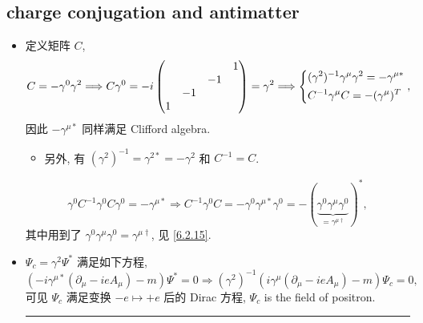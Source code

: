 \subsection{charge conjugation and antimatter}
\begin{itemize}
	\item 定义矩阵 $C$,
	\begin{equation}
		C = - \gamma^0 \gamma^2 \Longrightarrow C \gamma^0 = - i \begin{pmatrix}
			& & & 1 \\
			& & - 1 & \\
			& - 1 & & \\
			1 & & &
		\end{pmatrix} = \gamma^2 \Longrightarrow \begin{dcases}
			(\gamma^2)^{- 1} \gamma^\mu \gamma^2 = - \gamma^{\mu *} \\
			C^{- 1} \gamma^\mu C = - (\gamma^\mu)^T
		\end{dcases},
	\end{equation}
	因此 $- \gamma^{\mu *}$ 同样满足 Clifford algebra.
	\begin{itemize}
		\item 另外, 有 $(\gamma^2)^{- 1} = \gamma^{2 *} = - \gamma^2$ 和 $C^{- 1} = C$.
	\end{itemize}
	
	\begin{tcolorbox}[title=calculation:]
		\begin{equation}
			\gamma^0 C^{- 1} \gamma^0 C \gamma^0 = - \gamma^{\mu *} \Longrightarrow C^{- 1} \gamma^0 C = - \gamma^0 \gamma^{\mu *} \gamma^0 = - (\underbrace{\gamma^0 \gamma^\mu \gamma^0}_{= \gamma^{\mu \dag}})^*,
		\end{equation}
		其中用到了 $\gamma^0 \gamma^\mu \gamma^0 = \gamma^{\mu \dag}$, 见 \eqref{6.2.15}.
	\end{tcolorbox}
	
	\item $\Psi_c = \gamma^2 \Psi^*$ 满足如下方程,
	\begin{equation}
		(- i \gamma^{\mu *} (\partial_\mu - i e A_\mu) - m) \Psi^* = 0 \Longrightarrow (\gamma^2)^{- 1} (i \gamma^\mu (\partial_\mu - i e A_\mu) - m) \Psi_c = 0,
	\end{equation}
	可见 $\Psi_c$ 满足变换 $- e \mapsto + e$ 后的 Dirac 方程, $\Psi_c$ is the field of positron.
	
	\noindent\rule[0.5ex]{\linewidth}{0.5pt} %
	

\end{itemize}
